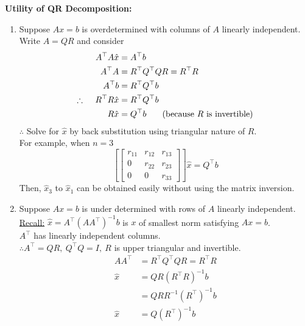 \documentclass[letterpaper]{article}
\begin{document}
\textbf{Utility of QR Decomposition:}
    \begin{enumerate}[1)]
	    \item Suppose $Ax=b$ is overdetermined with columns of $A$ linearly independent. Write $A=QR$ and consider
	        \begin{align*}
	            A^\top A\hat{x}&=A^\top b\\
	            A^\top A&=R^\top Q^\top QR=R^\top R\\
	            A^\top b&=R^\top Q^\top b\\
	            \therefore\hspace{1pc}R^\top R\hat{x}&=R^\top Q^\top b\\
	            R\hat{x}&=Q^\top b\textnormal{ \hspace{1pc} (because $R$ is invertible)}
	        \end{align*}
	        $\therefore$ Solve for $\hat{x}$ by back substitution using triangular nature of $R$.\\
	        For example, when $n=3$
	        $$\left[\begin{bmatrix} r_{11} & r_{12} & r_{13}\\ 0 & r_{22} &r_{23}\\ 0 & 0 & r_{33} \end{bmatrix}\right]\hat{x}=Q^\top b$$
	        Then, $\hat{x}_3$ to $\hat{x}_1$ can be obtained easily without using the matrix inversion.
	    \item Suppose $Ax=b$ is under determined with rows of $A$ linearly independent.
	        \underline{Recall:} $\hat{x}=A^\top (AA^\top)^{-1}b$ is $x$ of smallest norm satisfying $Ax=b$.\\
	        $A^\top$ has linearly independent columns.\\
            $\therefore A^\top=QR,\ Q^\top Q=I,\ R$ is upper triangular and invertible.
            \begin{align*}
	            AA^\top&=R^\top Q^\top QR=R^\top R\\
	            \hat{x}&=QR(R^\top R)^{-1}b\\
	            &=QRR^{-1}(R^\top)^{-1}b\\
	            \hat{x}&=Q(R^\top)^{-1}b
            \end{align*}
        \end{enumerate}
\end{document}
